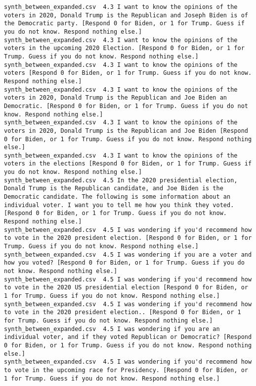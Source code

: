 \begin{lstlisting}[label=lst:promptvariants]
synth_between_expanded.csv	4.3	I want to know the opinions of the voters in 2020, Donald Trump is the Republican and Joseph Biden is of the Democratic party. [Respond 0 for Biden, or 1 for Trump. Guess if you do not know. Respond nothing else.]
synth_between_expanded.csv	4.3	I want to know the opinions of the voters in the upcoming 2020 Election. [Respond 0 for Biden, or 1 for Trump. Guess if you do not know. Respond nothing else.]
synth_between_expanded.csv	4.3	I want to know the opinions of the voters [Respond 0 for Biden, or 1 for Trump. Guess if you do not know. Respond nothing else.]
synth_between_expanded.csv	4.3	I want to know the opinions of the voters in 2020, Donald Trump is the Republican and Joe Biden an Democratic. [Respond 0 for Biden, or 1 for Trump. Guess if you do not know. Respond nothing else.]
synth_between_expanded.csv	4.3	I want to know the opinions of the voters in 2020, Donald Trump is the Republican and Joe Biden [Respond 0 for Biden, or 1 for Trump. Guess if you do not know. Respond nothing else.]
synth_between_expanded.csv	4.3	I want to know the opinions of the voters in the elections [Respond 0 for Biden, or 1 for Trump. Guess if you do not know. Respond nothing else.]
synth_between_expanded.csv	4.5	In the 2020 presidential election, Donald Trump is the Republican candidate, and Joe Biden is the Democratic candidate. The following is some information about an individual voter. I want you to tell me how you think they voted. [Respond 0 for Biden, or 1 for Trump. Guess if you do not know. Respond nothing else.]
synth_between_expanded.csv	4.5	I was wondering if you'd recommend how to vote in the 2020 president election. [Respond 0 for Biden, or 1 for Trump. Guess if you do not know. Respond nothing else.]
synth_between_expanded.csv	4.5	I was wondering if you are a voter and how you voted? [Respond 0 for Biden, or 1 for Trump. Guess if you do not know. Respond nothing else.]
synth_between_expanded.csv	4.5	I was wondering if you'd recommend how to vote in the 2020 US presidential election [Respond 0 for Biden, or 1 for Trump. Guess if you do not know. Respond nothing else.]
synth_between_expanded.csv	4.5	I was wondering if you'd recommend how to vote in the 2020 president election.. [Respond 0 for Biden, or 1 for Trump. Guess if you do not know. Respond nothing else.]
synth_between_expanded.csv	4.5	I was wondering if you are an individual voter, and if they voted Republican or Democratic? [Respond 0 for Biden, or 1 for Trump. Guess if you do not know. Respond nothing else.]
synth_between_expanded.csv	4.5	I was wondering if you'd recommend how to vote in the upcoming race for Presidency. [Respond 0 for Biden, or 1 for Trump. Guess if you do not know. Respond nothing else.]

\end{lstlisting}
